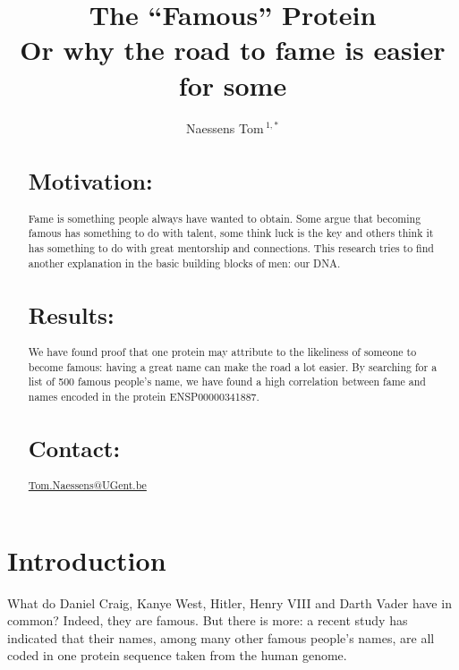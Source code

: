 \documentclass{bioinfo}
\begin{document}


\title[The ``Famous'' Protein]{The ``Famous'' Protein\\ \small{Or why the road to fame is easier for some}}
\author[Naessens Tom]{Naessens Tom\,$^{1,*}$}
\address{$^{1}$Department of Engineering,  Master of Computer Science: Software Engineering}


\editor{}

\maketitle
\begin{abstract}

\section{Motivation:}
Fame is something people always have wanted to obtain. Some argue that becoming famous has something to do with talent, some think luck is the key and others think it has something to do with great mentorship and connections. This research tries to find another explanation in the basic building blocks of men: our DNA.

\section{Results:}
We have found proof that one protein may attribute to the likeliness of someone to become famous: having a great name can make the road a lot easier. By searching for a list of 500 famous people's name, we have found a high correlation between fame and names encoded in the protein ENSP00000341887.

\section{Contact:} \href{Tom.Naessens@UGent.be}{Tom.Naessens@UGent.be}
\end{abstract}

\section{Introduction}
What do Daniel Craig, Kanye West, Hitler, Henry VIII and Darth Vader have in common? Indeed,  they are famous. But there is more: a recent study has indicated that their names, among many other famous people's names, are all coded in one protein sequence taken from the human genome.
\end{document}
